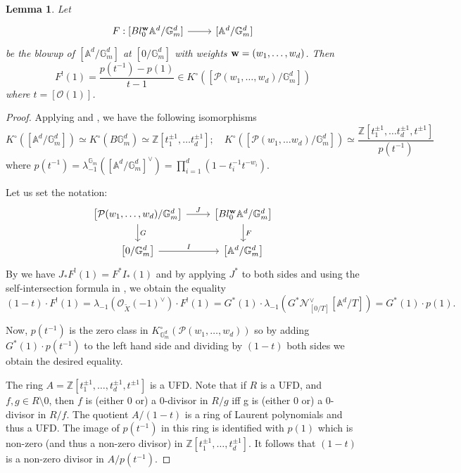 \documentclass[12pt]{amsart}
\newcommand\G{\mathbb{G}}
\newcommand\Gm{\mathbb{G}_m}
\newcommand{\bA}{\mathbb{A}}
\newcommand{\bZ}{\mathbb{Z}}
\newcommand{\sN}{\mathscr{N}}
\newcommand{\sO}{\mathscr{O}}
\newcommand{\cP}{\mathcal{P}}
\newcommand{\Kring}{K^{\circ}}
\newtheorem{Lemma}[theorem]{Lemma}
\theoremstyle{definition}
\begin{document}
\begin{Lemma}\label{lemma: T-equivariant case}
    Let
    \[
    \begin{tikzcd}
        F:{[Bl_0^{\bf{w}} \bA^d/\G_m^d]} \arrow[r] & {[\bA^d/\G_m^d]}
    \end{tikzcd}
    \]
    be the blowup of $[\bA^d/\G_m^d]$ at $[0/\G_m^d]$ with weights ${\bf{w}}=(w_1,\dots,w_d)$. Then 
    $$ F^{!}(1) = \frac{ p(t^{-1})-p(1)}{ t-1} \in \Kring([\cP(w_1,\dots,w_d)/\G_m^d])$$
     where $t=[\sO(1)]$.
\end{Lemma}

\begin{proof}
Applying  and , we have the following isomorphisms
$$\Kring([\bA^d/\Gm^d])\simeq \Kring(B\Gm^d) \simeq \bZ[t_1^{\pm 1}, \dots t_d^{\pm 1}]; \quad \Kring([\cP(w_1, \dots w_d)/\Gm^d]) \simeq \frac{\bZ[t_1^{\pm 1}, \dots t_d^{\pm 1},t^{\pm 1}]}{p(t^{-1})}$$ where  $p(t^{-1})=\lambda_{-1}^{\Gm}([\bA^d/\Gm^d]^\vee)=\prod_{i=1}^d(1-t_i^{-1}t^{-w_i})$.

Let us set the notation: $$\begin{tikzcd}
\left[\cP(w_1,\dots,w_d)/\Gm^d\right] \arrow[r, "J"] \arrow[d, "G"] &  \left[Bl_0^{\bf{w}} \bA^d/\Gm^d\right] \arrow[d, "F"] \\
\left[0/\Gm^d\right] \arrow[r, "I"] & \left[\bA^d/\Gm^d\right]
\end{tikzcd}$$ 
By  we have $J_*F^!(1)=F^*I_*(1)$ and by applying $J^*$ to both sides and using the self-intersection formula in , we obtain the equality
$$(1-t)\cdot F^!(1)=\lambda_{-1}(\sO_{\widetilde X}(-1)^\vee)\cdot F^!(1)=G^*(1) \cdot \lambda_{-1}(G^*\sN^\vee_{[0/T]}[\bA^d/T])=G^*(1) \cdot p(1).
$$

Now, $p(t^{-1})$ is the zero class in $\Kring_{\Gm^d}(\cP(w_1,\dots,w_d))$ so by adding $G^*(1) \cdot p(t^{-1})$ to the left hand side and dividing by $(1-t)$ both sides we obtain the desired equality.

The ring $A = \mathbb{Z}[t_1^{\pm 1}, \dots, t_d^{\pm 1}, t^{\pm 1}]$ is a UFD. Note that if $R$ is a UFD, and $f,g\in R\setminus0$, then $f$ is (either 0 or) a 0-divisor in $R/g$ iff g is (either 0 or) a 0-divisor in $R/f$. The quotient $A/(1-t)$ is a ring of Laurent polynomials and thus a UFD. The image of $p(t^{-1})$ in this ring is identified with $p(1)$ which is non-zero (and thus a non-zero divisor) in $\mathbb{Z}[t_1^{\pm 1}, \dots, t_d^{\pm 1}]$. It follows that $(1-t)$ is a non-zero divisor in $A/p(t^{-1})$.
\end{proof}
\end{document}

